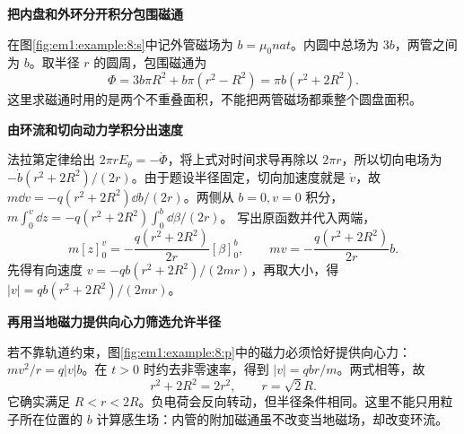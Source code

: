 \begin{solution}\textbf{把内盘和外环分开积分包围磁通}\par\nobreak
在图\ref{fig:em1:example:8:s}中记外管磁场为 $b=\mu_0nat$。内圆中总场为 $3b$，两管之间为 $b$。取半径 $r$ 的圆周，包围磁通为
\[\Phi=3b\pi R^2+b\pi(r^2-R^2)=\pi b(r^2+2R^2).\]
这里求磁通时用的是两个不重叠面积，不能把两管磁场都乘整个圆盘面积。



\par\medskip{}\noindent\textbf{由环流和切向动力学积分出速度}\par\nobreak
法拉第定律给出 $2\pi rE_\theta=-\dot\Phi$，将上式对时间求导再除以 $2\pi r$，所以切向电场为 $-\dot b(r^2+2R^2)/(2r)$。由于题设半径固定，切向加速度就是 $\dot v$，故 $m\dd v=-q(r^2+2R^2)\dd b/(2r)$。两侧从 $b=0,v=0$ 积分，
$m\int_0^{v}\dd z=-q(r^2+2R^2)\int_0^{b}\dd\beta/(2r)$。
写出原函数并代入两端，
\[
 m[z]_0^v=-\frac{q(r^2+2R^2)}{2r}[\beta]_0^b,
 \qquad mv=-\frac{q(r^2+2R^2)}{2r}b.
\]
先得有向速度 $v=-qb(r^2+2R^2)/(2mr)$，再取大小，得 $|v|=qb(r^2+2R^2)/(2mr)$。



\par\medskip{}\noindent\textbf{再用当地磁力提供向心力筛选允许半径}\par\nobreak
若不靠轨道约束，图\ref{fig:em1:example:8:p}中的磁力必须恰好提供向心力：$mv^2/r=q|v|b$。在 $t>0$ 时约去非零速率，得到 $|v|=qbr/m$。两式相等，故
\[r^2+2R^2=2r^2,\qquad r=\sqrt2R.\]
它确实满足 $R<r<2R$。负电荷会反向转动，但半径条件相同。这里不能只用粒子所在位置的 $b$ 计算感生场：内管的附加磁通虽不改变当地磁场，却改变环流。\end{solution}
